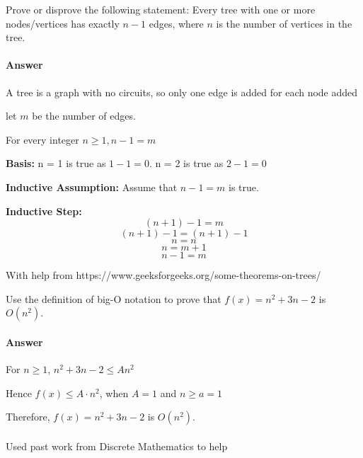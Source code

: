 \documentclass{article}
\begin{document}
\collab{}

Prove or disprove the following statement: Every tree with one or more
nodes/vertices has exactly $n-1$ edges, where $n$ is the number of vertices in
the tree.

\paragraph{Answer}

A tree is a graph with no circuits, so only one edge is added for each node added

let $m$ be the number of edges.

For every integer $n \geq 1, n - 1 = m$

{\bf Basis:} n = 1 is true as $1 - 1 = 0$. n = 2 is true as $2-1=0$

{\bf Inductive Assumption:} Assume that $n - 1 = m$ is true.

      {\bf Inductive Step:} $$(n+1) -1 = m $$
$$(n+1) -1 = (n +1) - 1$$
$$n=n$$
$$n=m +1$$
$$n-1=m$$

With help from https://www.geeksforgeeks.org/some-theorems-on-trees/


\collab{}

Use the definition of big-O notation to prove that $f(x)=n^2 + 3n -2$ is
$O(n^2)$.

\paragraph{Answer}

For $n \ge 1$, $ n^2 + 3n -2 \leq A n^2$

Hence $f(x) \leq A \cdot n^2$, when $A = 1$ and $n \geq a = 1$

Therefore, $f(x)=n^2 + 3n -2$ is $O(n^2)$.

\paragraph{}
Used past work from Discrete Mathematics to help
\end{document}
